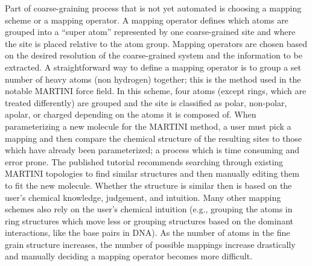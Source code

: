 Part of coarse-graining process that is not yet automated is choosing a mapping scheme or a mapping operator.
A mapping operator defines which atoms are grouped into a ``super atom'' represented by one coarse-grained site and where the site is placed relative to the atom group.
Mapping operators are chosen based on the desired resolution of the coarse-grained system and the information to be extracted.
A straightforward way to define a mapping operator is to group a set number of heavy atoms (non hydrogen) together; this is the method used in the notable MARTINI force field\cite{Marrink2007}.
In this scheme, four atoms (except rings, which are treated differently) are grouped and the site is classified as polar, non-polar, apolar, or charged depending on the atoms it is composed of.
When parameterizing a new molecule for the MARTINI method, a user must pick a mapping and then compare the chemical structure of the resulting sites to those which have already been parameterized; a process which is time consuming and error prone\cite{martini-tutorial}.
The published tutorial recommends searching through existing MARTINI topologies to find similar structures and then manually editing them to fit the new molecule.
Whether the structure is similar then is based on the user's chemical knowledge, judgement, and intuition.
Many other mapping schemes also rely on the user's chemical intuition (e.g., grouping the atoms in ring structures which move less or grouping structures based on the dominant interactions, like the base pairs in DNA)\cite{Huang2010, Knotts2007}.
As the number of atoms in the fine grain structure increases, the number of possible mappings increase drastically and manually deciding a mapping operator becomes more difficult.


